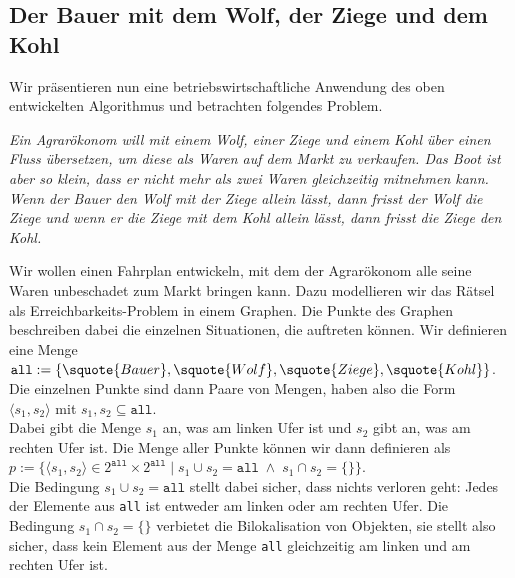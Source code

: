 \subsection{Der Bauer mit dem Wolf, der Ziege und dem Kohl}
Wir präsentieren nun eine betriebswirtschaftliche Anwendung des oben entwickelten Algorithmus und
betrachten folgendes Problem.
\vspace*{0.3cm}

\begin{minipage}[c]{14cm}
{\sl
Ein Agrarökonom will mit einem Wolf, einer Ziege und einem Kohl über einen Fluss übersetzen, um
diese als Waren auf dem Markt zu verkaufen.
Das Boot ist aber so klein, dass er nicht mehr als zwei Waren gleichzeitig mitnehmen kann.
Wenn der Bauer den Wolf mit der Ziege allein lässt, dann frisst der Wolf die Ziege und wenn er die
Ziege mit dem Kohl allein lässt, dann frisst die Ziege den Kohl. }
\end{minipage}
\vspace*{0.3cm}

\noindent
Wir wollen einen Fahrplan entwickeln, mit dem der Agrarökonom alle seine Waren unbeschadet zum
Markt bringen kann.  Dazu modellieren wir das Rätsel als Erreichbarkeits-Problem in einem
Graphen.  
Die Punkte des Graphen beschreiben dabei die einzelnen Situationen, die auftreten
können.  Wir definieren eine Menge\\[0.2cm]
\hspace*{1.3cm} 
$\texttt{all} := \{ \squote{Bauer}, \squote{Wolf}, \squote{Ziege},\squote{Kohl} \}$.
\\[0.2cm]
Die einzelnen Punkte sind dann Paare von Mengen, haben also die Form \\[0.2cm]
\hspace*{1.3cm} 
$\langle s_1, s_2 \rangle$ \quad mit $s_1,s_2 \subseteq \texttt{all}$.
\\[0.2cm]
Dabei gibt die Menge $s_1$ an, was am linken Ufer ist und $s_2$ gibt an, was am rechten
Ufer ist.  Die Menge aller Punkte können wir dann definieren als \\[0.2cm]
\hspace*{1.3cm} 
$p := \bigl\{ \langle s_1, s_2 \rangle \in 2^\texttt{all} \times 2^\texttt{all} \;|\;
              s_1 \cup s_2 = \texttt{all} \;\wedge\; s_1 \cap s_2 = \{\} 
      \bigr\}
$.
\\[0.2cm]
Die Bedingung $s_1 \cup s_2 = \texttt{all}$ stellt dabei sicher, dass nichts verloren
geht:  Jedes der Elemente aus \texttt{all} ist entweder am linken oder am rechten Ufer.
Die Bedingung $s_1 \cap s_2 = \{\}$ verbietet die Bilokalisation von Objekten, sie stellt also sicher,
dass kein Element aus der Menge \texttt{all}  gleichzeitig am  linken und am rechten Ufer ist.

